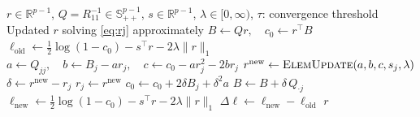 \documentclass[12pt]{amsart}
\numberwithin{equation}{section}
\numberwithin{equation}{section}
\theoremstyle{plain}
\theoremstyle{definition}
\newcommand{\R}{\mathbb{R}}
\begin{document}
\begin{algorithm}[H]
 \caption{Element-wise Coordinate Descent for Updating the Column Vector $r$}\label{alg:updater}
\begin{algorithmic}[1]
\Require $r\in\R^{p-1}$, $Q=R^{-1}_{11}\in\mathbb S^{p-1}_{++}$, $s\in\R^{p-1}$, $\lambda\in[0,\infty)$, $\tau$: convergence threshold
\Ensure Updated $r$ solving \eqref{eq:rj} approximately
    \Repeat
        \State $B \gets Qr,\quad c_0 \gets r^\top B$
        \State $\ell_{\mathrm{old}} \gets \frac12\log(1-c_0) - s^\top r - 2\lambda\|r\|_1$
            \State $a \gets Q_{jj},\quad b \gets B_j-a r_j,\quad c \gets c_0-a r_j^2-2 b r_j$
            \State $r^{\mathrm{new}}\gets \textsc{ElemUpdate}(a,b,c,s_j,\lambda)$ 
            \State $\delta \gets r^{\mathrm{new}}-r_j$
                \State $r_j \gets r^{\mathrm{new}}$
                \State $c_0 \gets c_0 + 2\delta B_j + \delta^2 a$
                \State $B \gets B + \delta \, Q_{\cdot j}$
            \EndIf
        \EndFor
        \State $\ell_{\mathrm{new}} \gets \frac12\log(1-c_0) - s^\top r - 2\lambda\|r\|_1$
        \State $\Delta \ell \gets \ell_{\mathrm{new}}-\ell_{\mathrm{old}}$
    \Until{$\Delta \ell \le \tau$}
    \State \Return $r$
\EndProcedure
\end{algorithmic}
\end{algorithm}
\end{document}
